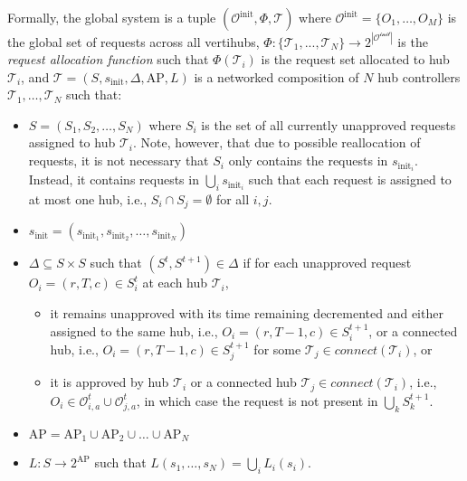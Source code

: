 Formally, the global system is a tuple $(\mathcal{O}^{\text{init}},\Phi, \mathcal{T})$ where $\mathcal{O}^{\text{init}} = \{O_1,\dots,O_M\}$ is the global set of requests across all vertihubs, $\Phi: \{\mathcal{T}_1, ..., \mathcal{T}_N\} \rightarrow 2^{|\mathcal{O^{\text{init}}}|}$ is the \emph{request allocation function} such that $\Phi(\mathcal{T}_i)$ is the request set allocated to hub $\mathcal{T}_i$, and $ \mathcal{T}= \left(S, s_{\text{init}},\Delta, \text{AP},L\right)$ is a networked composition of $N$ hub controllers $\mathcal{T}_1,\dots,\mathcal{T}_N$ such that:
\begin{itemize}
    \item $S = \left(S_1, S_2, \dots, S_N\right)$ where $S_i$ is the set of all currently unapproved requests assigned to hub $\mathcal{T}_i$.
    Note, however, that due to possible reallocation of requests, it is not necessary that $S_i$ only contains the requests in $s_{\text{init}_i}$. Instead, it contains requests in $\bigcup_i s_{\text{init}_i}$ such that each request is assigned to at most one hub, i.e., $S_i \cap S_j = \emptyset$ for all $i, j$.
    \item $s_{\text{init}} = \left(s_{\text{init}_1},s_{\text{init}_2},\dots,s_{\text{init}_N} \right)$
    \item $\Delta \subseteq S \times S$ such that $\left(S^t, S^{t+1}\right) \in \Delta$ if for each unapproved request $O_i = (r, T, c) \in S^t_i$ at each hub $\mathcal{T}_i$,
    \begin{itemize}
    \item it remains unapproved with its time remaining decremented and either assigned to the same hub, i.e., $O_i = (r, T-1, c) \in S^{t+1}_i$, or a connected hub, i.e., $O_i = (r, T-1, c) \in S_j^{t+1}$ for some $\mathcal{T}_j \in connect(\mathcal{T}_i)$, or
    \item it is approved by hub $\mathcal{T}_i$ or a connected hub $\mathcal{T}_j \in connect(\mathcal{T}_i)$, i.e., $O_i \in \mathcal{O}^t_{i,a} \cup \mathcal{O}^t_{j,a}$, in which case the request is not present in $\bigcup_k S_k^{t+1}$.
    \end{itemize}
    \item $ \text{AP} =  \text{AP}_1 \cup  \text{AP}_2 \cup \dots \cup  \text{AP}_N$
    \item $L : S \to 2^{\text{AP}}$ such that $L(s_1, \ldots, s_N) = \bigcup_i L_i(s_i)$.
\end{itemize}

